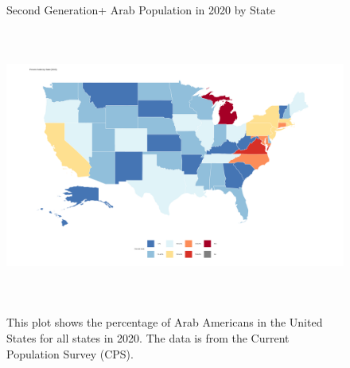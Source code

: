 \clearpage

\begin{center}
    \begin{figure}[H]
    \caption{Second Generation+ Arab Population in 2020 by State}
    \includegraphics[width=\textwidth, height=9cm]{figure/03-Arab-Map-2020.png} 
    \label{fig:diag}
    \caption*{\footnotesize{This plot shows the percentage of Arab Americans in the United States for all states in 2020. 
    The data is from the Current Population Survey (CPS).}}
    \end{figure}
    \hfill%
\end{center}

\clearpage


% 

\newpage



